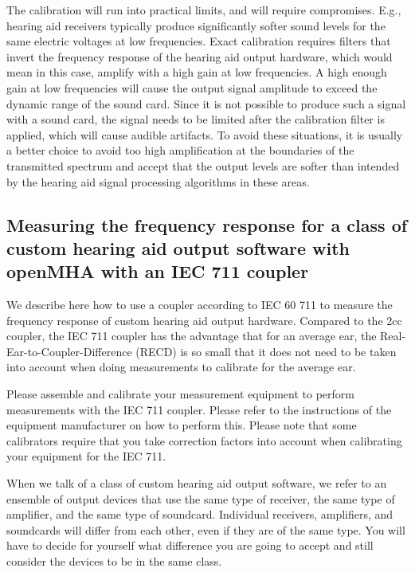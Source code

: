 \documentclass[11pt,a4paper,twoside]{article}
\newcommand{\+}{\discretionary{\mbox{\scriptsize$\hookleftarrow$}}{}{}}
\begin{document}
The calibration will run into practical limits, and will require
compromises.
%
E.g., hearing aid receivers typically produce significantly softer
sound levels for the same electric voltages at low frequencies.
%
Exact calibration requires filters that invert the frequency response
of the hearing aid output hardware, which would mean in this case,
amplify with a high gain at low frequencies.
%
A high enough gain at low frequencies will cause the output signal
amplitude to exceed the dynamic range of the sound card.
%
Since it is not possible to produce such a signal with a sound card,
the signal needs to be limited after the calibration filter is applied,
which will cause audible artifacts.
%
To avoid these situations, it is usually a better choice to avoid too
high amplification at the boundaries of the transmitted spectrum
and accept that the output levels are softer than intended by the
hearing aid signal processing algorithms in these areas.

\subsection{Measuring the frequency response for a class of custom hearing aid output software with openMHA with an IEC 711 coupler}

We describe here how to use a coupler according to IEC 60 711 to
measure the frequency response of custom hearing aid output hardware.
%
Compared to the 2cc coupler, the IEC 711 coupler has the advantage
that for an average ear, the Real-Ear-to-Coupler-Difference (RECD) is
so small that it does not need to be taken into account when doing
measurements to calibrate for the average ear.

Please assemble and calibrate your measurement equipment to perform
measurements with the IEC 711 coupler. Please refer to the
instructions of the equipment manufacturer on how to perform
this.
%
Please note that some calibrators require that you take correction
factors into account when calibrating your equipment for the IEC 711.

When we talk of a class of custom hearing aid output software, we
refer to an ensemble of output devices that use the same type of
receiver, the same type of amplifier, and the same type of soundcard.
%
Individual receivers, amplifiers, and soundcards will differ from each
other, even if they are of the same type.
%
You will have to decide for yourself what difference you are going to
accept and still consider the devices to be in the same class.
\end{document}
